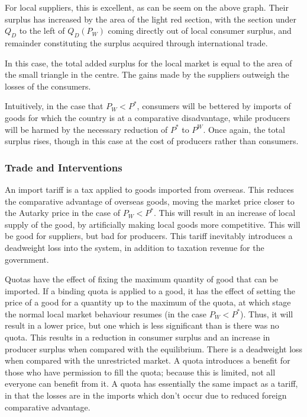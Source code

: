 \documentclass[12pt]{report}
\begin{document}
For local suppliers, this is excellent, as can be seem on the above graph.
Their surplus has increased by the area of the light red section, with the 
section under \(Q_D\) to the left of \(Q_D(P_W)\) coming directly out of 
local consumer surplus, and remainder constituting the surplus acquired through
international trade.

\bigskip
In this case, the total added surplus for the local market is equal to the area
of the small triangle in the centre. The gains made by the suppliers outweigh
the losses of the consumers.

\bigskip
Intuitively, in the case that \(P_W < P^*\), consumers will be bettered by
imports of goods for which the country is at a comparative disadvantage,
while producers will be harmed by the necessary reduction of \(P^*\) to \(P^W\).
Once again, the total surplus rises, though in this case at the cost of producers
rather than consumers.

\subsubsection*{Trade and Interventions}
An import tariff is a tax applied to goods imported from overseas. This
reduces the comparative advantage of overseas goods, moving the market price
closer to the Autarky price in the case of \(P_W < P^*\). This will result
in an increase of local supply of the good, by artificially making 
local goods more competitive. This will be good for suppliers, but bad
for producers. This tariff inevitably introduces a deadweight loss into
the system, in addition to taxation revenue for the government.

\bigskip
Quotas have the effect of fixing the maximum quantity of good that can be
imported. If a binding quota is applied to a good, it has the effect of setting the
price of a good for a quantity up to the maximum of the quota, at which stage
the normal local market behaviour resumes (in the case \(P_W < P^*\)).
Thus, it will result in a lower price, but one which is less significant
than is there was no quota. This results in a reduction in consumer surplus
and an increase in producer surplus when compared with the equilibrium.
There is a deadweight loss when compared with the unrestricted market.
A quota introduces a benefit for those who have permission to fill the quota;
because this is limited, not all everyone can benefit from it. A quota
has essentially the same impact as a tariff, in that the losses are in the
imports which don't occur due to reduced foreign comparative advantage.
\end{document}
